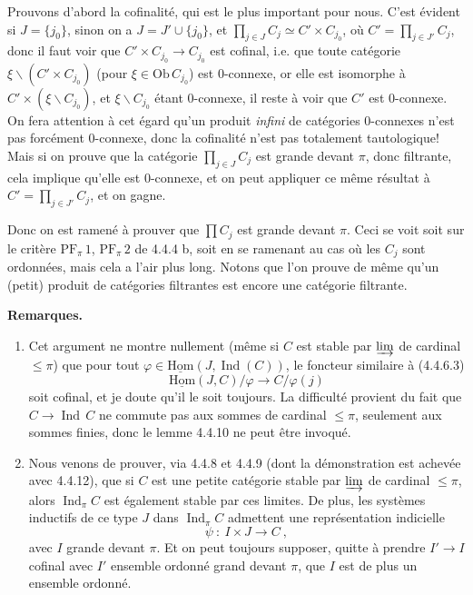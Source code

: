 \documentclass[11pt]{article}
\newcommand{\printedpage}[1]{\if\relax\detokenize{#1}\relax\else\marginpar{\footnotesize p.~#1}\fi}
\newcommand{\msp}[1]{\marginpar{\footnotesize [#1]}}
\newcommand{\uHom}{\underline{\mathrm{Hom}}}
\newcommand{\Ob}{\mathrm{Ob}\,}
\newcommand{\Ind}{\operatorname{Ind}}
\begin{document}
Prouvons d'abord la cofinalité, qui est le plus important pour nous. C'est évident si $J = \{j_0\}$, sinon on a $J = J' \cup \{j_0\}$, et $\prod_{j\in J} C_j \simeq C' \times C_{j_0}$, où $C' = \prod_{j\in J'} C_j$, donc il faut voir que $C' \times C_{j_0} \longrightarrow C_{j_0}$ est cofinal, i.e. que toute catégorie $\xi\backslash(C' \times C_{j_0})$ (pour $\xi \in \Ob C_{j_0}$) est 0-connexe, or elle est isomorphe à $C' \times (\xi\backslash C_{j_0})$, et $\xi\backslash C_{j_0}$ étant 0-connexe, il reste à voir que $C'$ est 0-connexe. On fera attention à cet égard qu'un produit \textit{infini} de catégories 0-connexes n'est pas forcément 0-connexe, donc la cofinalité n'est pas totalement tautologique! Mais si on prouve que la catégorie $\prod_{j\in J} C_j$ est
\printedpage{23}
\msp{page 94}
grande devant $\pi$, donc filtrante, cela implique qu'elle est 0-connexe, et on peut appliquer ce même résultat à $C' = \prod_{j\in J'} C_j$, et on gagne.

Donc on est ramené à prouver que $\prod C_j$ est grande devant $\pi$. Ceci se voit soit sur le critère $\mathrm{PF}_\pi\,1$, $\mathrm{PF}_\pi\,2$ de 4.4.4 b, soit en se ramenant au cas où les $C_j$ sont ordonnées, mais cela a l'air plus long. Notons que l'on prouve de même qu'un (petit) produit de catégories filtrantes est encore une catégorie filtrante.

\textbf{Remarques.}
\begin{enumerate}[label={}, leftmargin=*]
\item[1.] Cet argument ne montre nullement (même si $C$ est stable par $\varinjlim$ de cardinal $\leqslant \pi$) que pour tout $\varphi \in \uHom(J,\Ind(C))$, le foncteur similaire à (4.4.6.3)
\[
\uHom(J,C)/\varphi \longrightarrow C/\varphi(j)
\]
soit cofinal, et je doute qu'il le soit toujours. La difficulté provient du fait que $C \longrightarrow \Ind\, C$ ne commute pas aux sommes de cardinal $\leqslant \pi$, seulement aux sommes finies,
\msp{page 95}
donc le lemme 4.4.10 ne peut être invoqué.
\item[2.] Nous venons de prouver, via 4.4.8 et 4.4.9 (dont la démonstration est achevée avec 4.4.12), que si $C$ est une petite catégorie stable par $\varinjlim$ de cardinal $\leqslant \pi$, alors $\Ind_\pi C$ est également stable par ces limites. De plus, les systèmes inductifs de ce type $J$ dans $\Ind_\pi C$ admettent une représentation indicielle
\[
\psi \ :\ I \times J \longrightarrow C\ ,
\]
avec $I$ grande devant $\pi$. Et on peut toujours supposer, quitte à prendre $I' \longrightarrow I$ cofinal avec $I'$ ensemble ordonné grand devant $\pi$, que $I$ est de plus un ensemble ordonné.
\end{enumerate}
\end{document}
